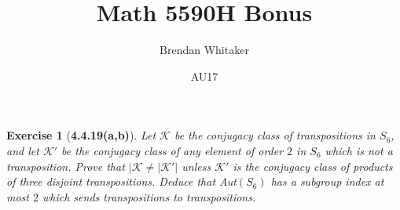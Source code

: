 \documentclass[10pt,oneside,reqno]{amsart}
\theoremstyle{plain}
\newtheorem*{e}{Exercise}
\theoremstyle{definition}
\begin{document}
\title{Math 5590H Bonus}

\date{AU17}

\author[Brendan Whitaker]{Brendan Whitaker}

\maketitle

\begin{e}[\textbf{4.4.19(a,b)}]
Let $\mathcal{K}$ be the conjugacy class of transpositions in $S_6$, and let $\mathcal{K}'$ be the conjugacy class of any element of order $2$ in $S_6$ which is not a transposition. Prove that $|\mathcal{K} \neq |\mathcal{K}'|$ unless $\mathcal{K}'$ is the conjugacy class of products of three disjoint transpositions. Deduce that  Aut$(S_6)$ has a subgroup index at most $2$ which sends transpositions to transpositions. 
\end{e}
\end{document}
